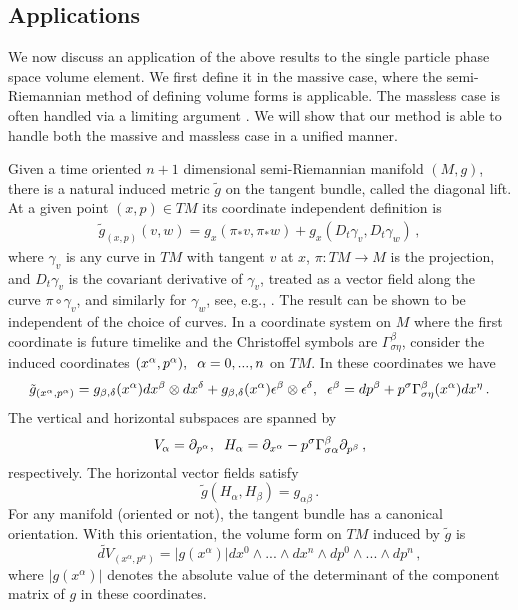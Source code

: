 \subsection{Applications}
We now discuss an application of the above results to the single particle phase space volume element. We first define it in the massive case, where the semi-Riemannian method of defining volume forms is applicable. The massless case is often handled via a limiting argument \cite{tsamparlis}. We will show that our method is able to handle both the massive and massless case in a unified manner.

 Given a time oriented $n+1$ dimensional semi-Riemannian manifold $(M,g)$, there is a natural induced metric $\tilde{g}$ on the tangent bundle, called the diagonal lift. At a given point $(x,p)\in TM$ its coordinate independent definition is
\begin{align}
\tilde{g}_{(x,p)}(v,w)=g_x(\pi_{*} v,\pi_{*} w)+g_x(D_t \gamma_v, D_t \gamma_w)\,,
\end{align}
where $\gamma_v$ is any curve in $TM$ with tangent $v$ at $x$, $\pi:TM\longrightarrow M$ is the projection, and $D_t\gamma_v$ is the covariant derivative of $\gamma_v$, treated as a vector field along the curve $\pi\circ\gamma_v$, and similarly for $\gamma_w$, see, e.g., \cite{pettini}. The result can be shown to be independent of the choice of curves. In a coordinate system on $M$ where the first coordinate is future timelike and the Christoffel symbols are $\Gamma^\beta_{\sigma\eta}$, consider the induced coordinates $(x^\alpha,p^\alpha), \hspace{2mm}\alpha=0,...,n$ on $TM$. In these coordinates we have 
\begin{equation}
\tilde{g}_{(x^\alpha,p^\alpha)}=g_{\beta,\delta}(x^\alpha)dx^\beta\otimes dx^\delta +g_{\beta,\delta}(x^{\alpha})\epsilon^\beta\otimes \epsilon^\delta, \hspace{2mm} \epsilon^\beta=dp^\beta+p^\sigma\Gamma^\beta_{\sigma\eta}(x^{\alpha})dx^\eta\,.
\end{equation}
The vertical and horizontal subspaces are spanned by
\begin{equation}\label{horizontalSubspace}
V_\alpha=\partial_{p^\alpha}, \hspace{2mm} H_\alpha=\partial_{x^\alpha}-p^\sigma\Gamma_{\sigma\alpha}^\beta\partial_{p^\beta}\,,
\end{equation}
respectively. The horizontal vector fields satisfy
\begin{equation}
\tilde{g}(H_\alpha,H_\beta)=g_{\alpha\beta}\,.
\end{equation}
For any manifold (oriented or not), the tangent bundle has a canonical orientation. With this orientation, the volume form on $TM$ induced by $\tilde{g}$ is
\begin{equation}
\widetilde{dV}_{(x^\alpha,p^{\alpha})}=|g(x^\alpha)|dx^0\wedge...\wedge dx^n\wedge dp^0\wedge...\wedge dp^n\,,
\end{equation}
where $|g(x^\alpha)|$ denotes the absolute value of the determinant of the component matrix of $g$ in these coordinates.

